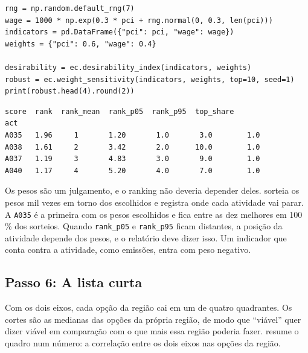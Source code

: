 \begin{lstlisting}
rng = np.random.default_rng(7)
wage = 1000 * np.exp(0.3 * pci + rng.normal(0, 0.3, len(pci)))
indicators = pd.DataFrame({"pci": pci, "wage": wage})
weights = {"pci": 0.6, "wage": 0.4}

desirability = ec.desirability_index(indicators, weights)
robust = ec.weight_sensitivity(indicators, weights, top=10, seed=1)
print(robust.head(4).round(2))
\end{lstlisting}
\begin{lstlisting}[language={}, numbers=none, backgroundcolor=\color{white}, frame=leftline, framerule=2pt, rulecolor=\color{noteborder}, xleftmargin=1.5em]
      score  rank  rank_mean  rank_p05  rank_p95  top_share
act                                                        
A035   1.96     1       1.20       1.0       3.0        1.0
A038   1.61     2       3.42       2.0      10.0        1.0
A037   1.19     3       4.83       3.0       9.0        1.0
A040   1.17     4       5.20       4.0       7.0        1.0
\end{lstlisting}

Os pesos são um julgamento, e o ranking não deveria depender
deles.  sorteia os pesos mil vezes em torno dos
escolhidos e registra onde cada atividade vai parar. A
\texttt{A035} é a primeira com os pesos escolhidos e fica
entre as dez melhores em 100\,\% dos
sorteios. Quando \texttt{rank\_p05} e \texttt{rank\_p95} ficam distantes,
a posição da atividade depende dos pesos, e o relatório deve dizer isso.
Um indicador que conta contra a atividade, como emissões, entra com peso
negativo.

\subsection{Passo 6: A lista curta}

Com os dois eixos, cada opção da região cai em um de quatro
quadrantes. Os cortes são as medianas das opções da própria região, de
modo que ``viável'' quer dizer viável em comparação com o que mais essa
região poderia fazer.  resume o quadro num
número: a correlação entre os dois eixos nas opções da região.

